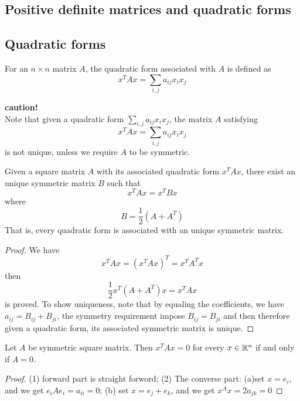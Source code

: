 \begin{refsection}
\section{Positive definite matrices and quadratic forms}
\subsection{Quadratic forms}
\begin{definition}
For an $n\times n$ matrix $A$, the quadratic form associated with $A$ is defined as
$$x^TAx = \sum_{i,j}a_{ij}x_ix_j$$
\end{definition}

\begin{mdframed}
\textbf{caution!}\\
Note that given a quadratic form  $\sum_{i,j}a_{ij}x_ix_j$, the matrix $A$ satisfying
$$x^TAx = \sum_{i,j}a_{ij}x_ix_j$$
is not unique, unless we require $A$ to be symmetric.
\end{mdframed}


\begin{lemma}
Given a square matrix $A$ with its associated quadratic form $x^TAx$, there exist an unique symmetric matrix $B$ such that
$$x^TAx = x^TBx$$
where $$B = \frac{1}{2}(A+A^T)$$
That is, every quadratic form is associated with an unique symmetric matrix.
\end{lemma}
\begin{proof}
We have
$$x^TAx = (x^TAx)^T = x^TA^Tx$$
then $$\frac{1}{2}x^T(A+A^T)x = x^TAx$$ is proved.
To show uniqueness, note that by equaling the coefficients, we have $a_{ij} = B_{ij} + B_{ji}$, the symmetry requirement impose $B_{ij} = B_{ji}$ and then therefore given a quadratic form, its associated symmetric matrix is unique.
\end{proof}

\begin{lemma}
Let $A$ be symmetric square matrix. Then $x^TAx = 0$ for every $x\in\mathbb{R}^n$ if and only if $A = 0$.
\end{lemma}
\begin{proof}
(1) forward part is straight forword; (2) The converse part: (a)set $x=e_i$, and we get $e_iAe_i = a_{ii} = 0$; (b) set $x=e_j+e_k$, and we get $x^Ax = 2a_{jk} = 0$
\end{proof}






\end{refsection}
